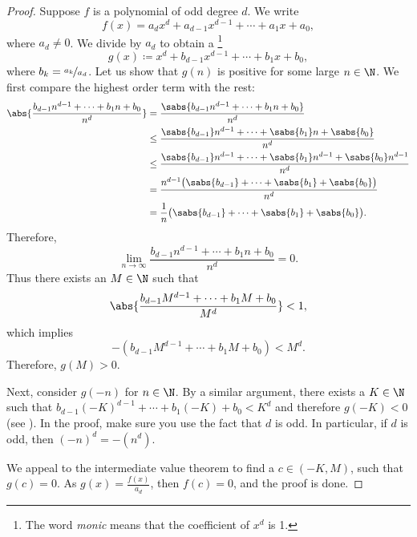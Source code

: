 \begin{proof}
Suppose $f$ is a polynomial of odd degree $d$.  We write
\begin{equation*}
f(x) = a_d x^d + a_{d-1} x^{d-1} + \cdots + a_1 x + a_0 ,
\end{equation*}
where $a_d \not= 0$.  We divide by $a_d$ to obtain a 
\emph{}\footnote{The word \emph{monic} means that
the coefficient of $x^d$ is 1.}
\begin{equation*}
g(x) \coloneqq x^d + b_{d-1} x^{d-1} + \cdots + b_1 x + b_0 ,
\end{equation*}
where $b_k = \nicefrac{a_k}{a_d}$.
Let us show that $g(n)$ is
positive for some large $n \in \N$.
We first compare the highest order term with the rest:
\begin{equation*}
\begin{split}
\abs{\frac{b_{d-1} n^{d-1} + \cdots + b_1 n + b_0}{n^d}}
& =
\frac{\sabs{b_{d-1} n^{d-1} + \cdots + b_1 n + b_0}}{n^d}
\\
& \leq
\frac{\sabs{b_{d-1}} n^{d-1} + \cdots + \sabs{b_1} n + \sabs{b_0}}{n^d}
\\
& \leq
\frac{\sabs{b_{d-1}} n^{d-1} + \cdots + \sabs{b_1} n^{d-1} + \sabs{b_0} n^{d-1}}{n^d}
\\
& =
\frac{n^{d-1}\bigl(\sabs{b_{d-1}} + \cdots + \sabs{b_1} + \sabs{b_0}\bigr)}{n^d}
\\
& =
\frac{1}{n}
\bigl(\sabs{b_{d-1}} + \cdots + \sabs{b_1} + \sabs{b_0}\bigr) .
\end{split}
\end{equation*}
Therefore,
\begin{equation*}
\lim_{n\to\infty} \frac{b_{d-1} n^{d-1} + \cdots + b_1 n + b_0}{n^d}
= 0 .
\end{equation*}
Thus there exists an $M \in \N$ such that 
\begin{equation*}
\abs{\frac{b_{d-1} M^{d-1} + \cdots + b_1 M + b_0}{M^d}} < 1 ,
\end{equation*}
which implies
\begin{equation*}
-(b_{d-1} M^{d-1} + \cdots + b_1 M + b_0) < M^d .
\end{equation*}
Therefore, $g(M) > 0$.

Next, consider $g(-n)$ for $n \in \N$.  By a similar argument,
there exists a $K \in \N$ such that
$b_{d-1} {(-K)}^{d-1} + \cdots + b_1 (-K) + b_0 < K^d$
and therefore $g(-K) < 0$ (see ).
In the proof,
 make sure you use the fact that $d$ is odd.
In particular, if $d$ is odd, then ${(-n)}^d = -(n^d)$.

We appeal to the intermediate value theorem to find a
$c \in (-K,M)$, such that $g(c) = 0$.  As $g(x) = \frac{f(x)}{a_d}$,
then $f(c) = 0$, and the proof is done.
\end{proof}


